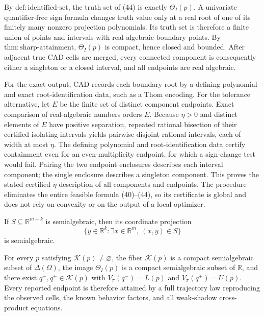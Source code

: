 By \(\mathrm{def{:}identified\text{-}set}\), the truth set of (44) is exactly \(\Theta_I(p)\).  A univariate quantifier-free sign formula changes truth value only at a real root of one of its finitely many nonzero projection polynomials.  Its truth set is therefore a finite union of points and intervals with real-algebraic boundary points.  By \(\mathrm{thm{:}sharp\text{-}attainment}\), \(\Theta_I(p)\) is compact, hence closed and bounded.  After adjacent true CAD cells are merged, every connected component is consequently either a singleton or a closed interval, and all endpoints are real algebraic.

For the exact output, CAD records each boundary root by a defining polynomial and exact root-identification data, such as a Thom encoding.  For the tolerance alternative, let \(E\) be the finite set of distinct component endpoints.  Exact comparison of real-algebraic numbers orders \(E\).  Because \(\eta>0\) and distinct elements of \(E\) have positive separation, repeated rational bisection of their certified isolating intervals yields pairwise disjoint rational intervals, each of width at most \(\eta\).  The defining polynomial and root-identification data certify containment even for an even-multiplicity endpoint, for which a sign-change test would fail.  Pairing the two endpoint enclosures describes each interval component; the single enclosure describes a singleton component.  This proves the stated certified \(\eta\)-description of all components and endpoints.  The procedure eliminates the entire feasible formula (40)--(44), so its certificate is global and does not rely on convexity or on the output of a local optimizer.

If \(S\subseteq\mathbb R^{m+k}\) is semialgebraic, then its coordinate projection
\[
\{y\in\mathbb R^k:\exists x\in\mathbb R^m,\ (x,y)\in S\}
\]
is semialgebraic.

For every \(p\) satisfying \(\mathcal K(p)\ne\varnothing\), the fiber \(\mathcal K(p)\) is a compact semialgebraic subset of \(\Delta(\Omega)\), the image \(\Theta_I(p)\) is a compact semialgebraic subset of \(\mathbb R\), and there exist \(q^-,q^+\in\mathcal K(p)\) with \(V_\pi(q^-)=L(p)\) and \(V_\pi(q^+)=U(p)\). Every reported endpoint is therefore attained by a full trajectory law reproducing the observed cells, the known behavior factors, and all weak-shadow cross-product equations.
